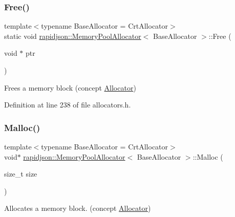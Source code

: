\subsubsection{\texorpdfstring{Free()}{Free()}}
{\footnotesize\ttfamily template$<$typename Base\+Allocator = Crt\+Allocator$>$ \\
static void \mbox{\hyperlink{classrapidjson_1_1_memory_pool_allocator}{rapidjson\+::\+Memory\+Pool\+Allocator}}$<$ Base\+Allocator $>$\+::Free (\begin{DoxyParamCaption}\item[{void $\ast$}]{ptr }\end{DoxyParamCaption})\hspace{0.3cm}{\ttfamily [static]}}



Frees a memory block (concept \mbox{\hyperlink{classrapidjson_1_1_allocator}{Allocator}}) 



Definition at line 238 of file allocators.\+h.


\begin{DoxyCode}{0}

\end{DoxyCode}
\mbox{\label{classrapidjson_1_1_memory_pool_allocator_a208c29e04b1d748bfe068444b7044344}} 
\subsubsection{\texorpdfstring{Malloc()}{Malloc()}}
{\footnotesize\ttfamily template$<$typename Base\+Allocator = Crt\+Allocator$>$ \\
void$\ast$ \mbox{\hyperlink{classrapidjson_1_1_memory_pool_allocator}{rapidjson\+::\+Memory\+Pool\+Allocator}}$<$ Base\+Allocator $>$\+::Malloc (\begin{DoxyParamCaption}\item[{size\+\_\+t}]{size }\end{DoxyParamCaption})}



Allocates a memory block. (concept \mbox{\hyperlink{classrapidjson_1_1_allocator}{Allocator}}) 



